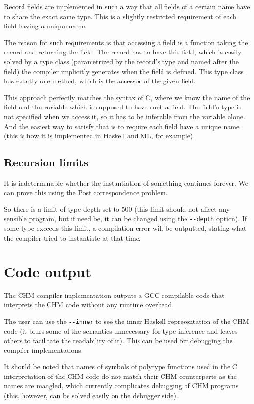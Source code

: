 Record fields are implemented in such a way that all fields of a certain name have to share the exact same type. This is a slightly restricted requirement of each field having a unique name.

The reason for such requirements is that accessing a field is a function taking the record and returning the field. The record has to have this field, which is easily solved by a type class (parametrized by the record's type and named after the field) the compiler implicitly generates when the field is defined. This type class has exactly one method, which is the accessor of the given field.

This approach perfectly matches the syntax of C, where we know the name of the field and the variable which is supposed to have such a field. The field's type is not specified when we access it, so it has to be inferable from the variable alone. And the easiest way to satisfy that is to require each field have a unique name (this is how it is implemented in Haskell and ML, for example).

\subsection{Recursion limits}

It is indeterminable whether the instantiation of something continues forever. We can prove this using the Post correspondence problem. %

So there is a limit of type depth set to 500 (this limit should not affect any sensible program, but if need be, it can be changed using the \lstinline[language=sh]{--depth} option). If some type exceeds this limit, a compilation error will be outputted, stating what the compiler tried to instantiate at that time.

\section{Code output}

The CHM compiler implementation outputs a GCC-compilable code that interprets the CHM code without any runtime overhead.

The user can use the \lstinline[language=sh]{--inner} to see the inner Haskell representation of the CHM code (it blurs some of the semantics unnecessary for type inference and leaves others to facilitate the readability of it). This can be used for debugging the compiler implementations.

It should be noted that names of symbols of polytype functions used in the C interpretation of the CHM code do not match their CHM counterparts as the names are mangled, which currently complicates debugging of CHM programs (this, however, can be solved easily on the debugger side).
